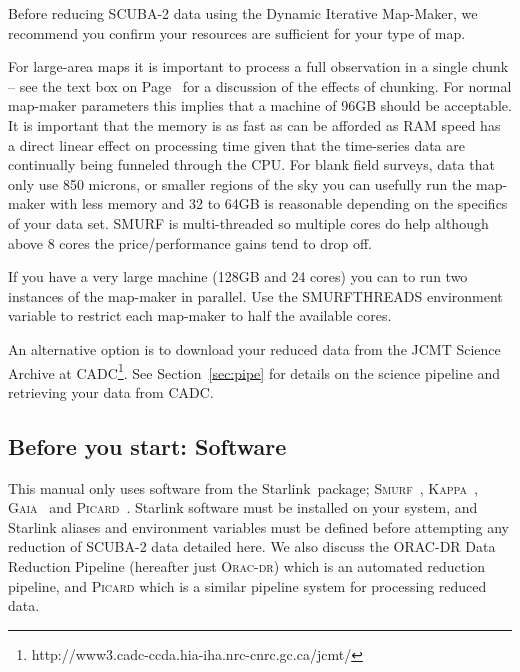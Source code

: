 \documentclass[twoside,11pt]{article}
\newcommand{\htmladdnormallink}[2]{#1}
\newcommand{\xref}[3]{#1}
\newcommand{\xlabel}[1]{}
\renewcommand{\_}{\texttt{\symbol{95}}}
\newcommand{\starlink}{\htmladdnormallink{Starlink}{http://starlink.jach.hawaii.edu}}
\newcommand{\gaia}{\xref{\textsc{Gaia}}{sun214}{}}
\newcommand{\Kappa}{\xref{\textsc{Kappa}}{sun95}{}}
\newcommand{\oracdr}{\htmladdnormallink{\textsc{Orac-dr}}{http://www.oracdr.org/oracdr}}
\newcommand{\picard}{\xref{\textsc{Picard}}{sun265}{}}
\newcommand{\smurf}{\xref{\textsc{Smurf}}{sun258}{}}
\begin{document}
Before reducing SCUBA-2 data using the Dynamic Iterative Map-Maker, we
recommend you confirm your resources are sufficient for your type of
map.

For large-area maps it is important to process a full observation in a
single chunk -- see the text box on Page~\pageref{page:text} for a
discussion of the effects of chunking. For normal map-maker parameters
this implies that a machine of 96GB should be acceptable. It is
important that the memory is as fast as can be afforded as RAM speed
has a direct linear effect on processing time given that the
time-series data are continually being funneled through the CPU.  For
blank field surveys, data that only use 850 microns, or smaller
regions of the sky you can usefully run the map-maker with less memory
and 32 to 64GB is reasonable depending on the specifics of your data
set. SMURF is multi-threaded so multiple cores do help although above
8 cores the price/performance gains tend to drop off.

If you have a very large machine (128GB and 24 cores) you can to run
two instances of the map-maker in parallel. Use the SMURF\_THREADS
environment variable to restrict each map-maker to half the available
cores.

An alternative option is to download your reduced data from the JCMT
Science Archive at
CADC\footnote{http://www3.cadc-ccda.hia-iha.nrc-cnrc.gc.ca/jcmt/}. See
Section~\ref{sec:pipe} for details on the science pipeline and
retrieving your data from CADC.

\subsection{\xlabel{software}Before you start: Software}

This manual only uses software from the \starlink\ package;
\smurf\ \cite{smurf}, \Kappa\ \cite{kappa}, \gaia\ \cite{gaia} and
\picard\ \cite{picard}.
Starlink software must be installed on your system, and Starlink aliases
and environment variables must be defined before attempting any
reduction of SCUBA-2 data detailed here. We also discuss the ORAC-DR
Data Reduction Pipeline\cite{oracdr} (hereafter just \oracdr) which is
an automated reduction pipeline, and \textsc{Picard} which is a similar
pipeline system for processing reduced data.
\end{document}

